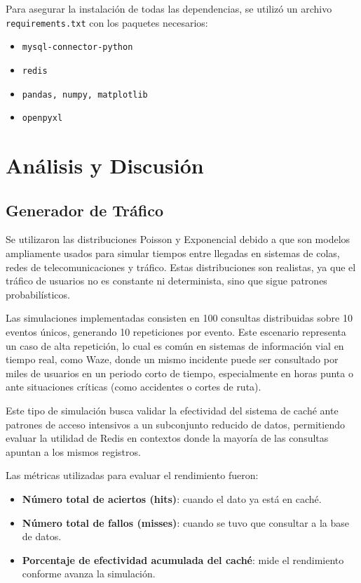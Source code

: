 \documentclass[12pt]{article}
\begin{document}
Para asegurar la instalación de todas las dependencias, se utilizó un archivo \texttt{requirements.txt} con los paquetes necesarios:

\begin{itemize}
    \item \texttt{mysql-connector-python}
    \item \texttt{redis}
    \item \texttt{pandas, numpy, matplotlib}
    \item \texttt{openpyxl}
\end{itemize}

\section{Análisis y Discusión}

\subsection{Generador de Tráfico}

Se utilizaron las distribuciones Poisson y Exponencial debido a que son modelos ampliamente usados para simular tiempos entre llegadas en sistemas de colas, redes de telecomunicaciones y tráfico. Estas distribuciones son realistas, ya que el tráfico de usuarios no es constante ni determinista, sino que sigue patrones probabilísticos.

Las simulaciones implementadas consisten en 100 consultas distribuidas sobre 10 eventos únicos, generando 10 repeticiones por evento. Este escenario representa un caso de alta repetición, lo cual es común en sistemas de información vial en tiempo real, como Waze, donde un mismo incidente puede ser consultado por miles de usuarios en un periodo corto de tiempo, especialmente en horas punta o ante situaciones críticas (como accidentes o cortes de ruta).

Este tipo de simulación busca validar la efectividad del sistema de caché ante patrones de acceso intensivos a un subconjunto reducido de datos, permitiendo evaluar la utilidad de Redis en contextos donde la mayoría de las consultas apuntan a los mismos registros.

Las métricas utilizadas para evaluar el rendimiento fueron:

\begin{itemize}
    \item \textbf{Número total de aciertos (hits)}: cuando el dato ya está en caché.
    \item \textbf{Número total de fallos (misses)}: cuando se tuvo que consultar a la base de datos.
    \item \textbf{Porcentaje de efectividad acumulada del caché}: mide el rendimiento conforme avanza la simulación.
\end{itemize}
\end{document}
